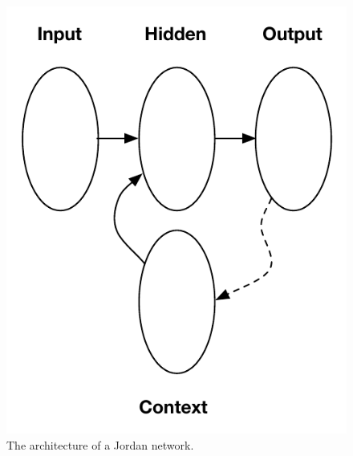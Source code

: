 \documentclass{acm_proc_article-sp}
\begin{document}
\begin{figure}
\begin{center}
\includegraphics[scale=.8]{Images/jordan.pdf}
\caption{The architecture of a Jordan network.}
\label{fig:jordan}
\end{center}
\end{figure}
\end{document}
